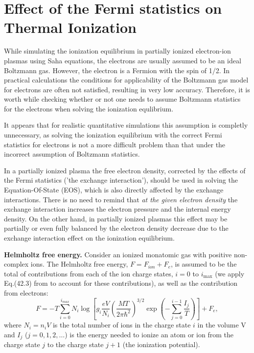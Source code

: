 
\section{Effect of the Fermi statistics on Thermal Ionization}

While simulating the ionization equilibrium in partially ionized electron-ion plasmas using Saha 
equations, the electrons are usually assumed to be an ideal Boltzmann gas.  However, the electron is a Fermion with the spin of 1/2. In practical calculations the conditions for
applicability of the Boltzmann gas model for electrons are often not satisfied, resulting in
very low accuracy. Therefore, it is worth while checking whether or not one needs to assume Boltzmann statistics for the electrons when solving the ionization equlibrium.

It appears that 
for realistic quantitative simulations this assumption is completly unnecessary, as solving the 
ionization equilibrium with the correct Fermi statistics for electrons is not a more difficult problem
than that under the incorrect assumption of Boltzmann statistics.

In a partially ionized plasma the free electron density, corrected by the effects of the Fermi statistics 
('the exchange interaction'), should be used in solving the Equation-Of-State (EOS), which is also 
directly affected by the exchange interactions. There is no need to remind that 
{\it at the given electron density} the exchange interaction increases the electron pressure and the 
internal energy density. On the other hand, in partially ionized plasmas this effect may 
be partially or even fully balanced by the electron density decrease due to the exchange interaction 
effect on the ionization equilibrium.  

{\bf Helmholtz free energy.} Consider an ionized monatomic gas with positive non-complex ions. The Helmholtz free energy,
$F=F_{ion}+F_e$, is assumed to be the total of contributions from each of the ion charge states,
$i=0$ to $i_{\max}$ (we apply Eq.(42.3) from \cite{ll} to account for these contributions), as well as the contribution from electrons:
\begin{equation}\label{freeenergy}
F=-T
\sum_{i=0}^{i_{max}}{
N_i\log\left[g_i
             \frac{eV}{N_i}\left(\frac{MT}{2\pi \hbar^2}\right)^{3/2}\exp \left(-\sum_{j=0}^{i-1}\frac{I_j}T \right)\right]}+F_e,
\end{equation}  
where $N_i=n_iV$ is the total number of ions in the charge state $i$ in the volume V and
$I_j$ ($j = 0, 1, 2, \dots$) is the energy needed to ionize an atom or ion from the charge state $j$ to the charge state $j+1$ (the ionization potential).

